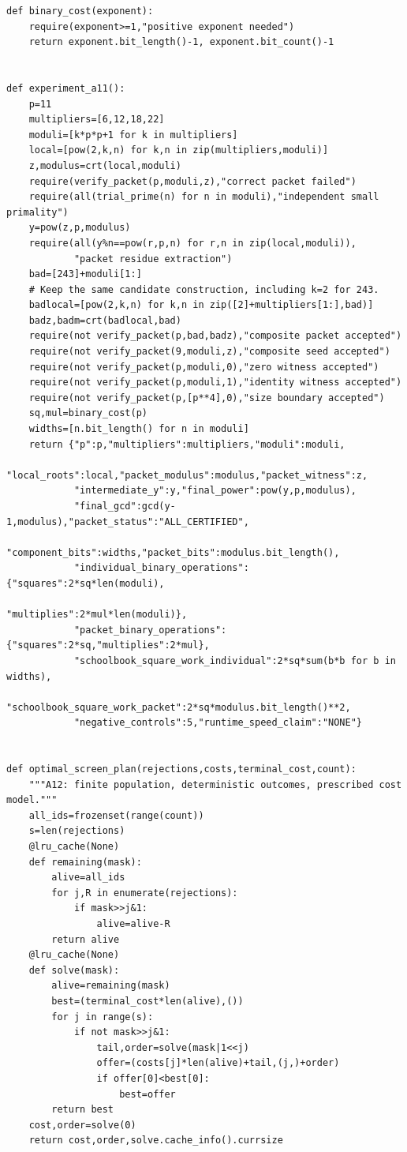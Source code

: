 \documentclass[11pt,a4paper]{article}
\theoremstyle{definition}\newtheorem{definition}[theorem]{Definition}
\theoremstyle{remark}\newtheorem{remark}[theorem]{Remark}
\begin{document}
\begin{lstlisting}[label=lst:arithmetic]
def binary_cost(exponent):
    require(exponent>=1,"positive exponent needed")
    return exponent.bit_length()-1, exponent.bit_count()-1


def experiment_a11():
    p=11
    multipliers=[6,12,18,22]
    moduli=[k*p*p+1 for k in multipliers]
    local=[pow(2,k,n) for k,n in zip(multipliers,moduli)]
    z,modulus=crt(local,moduli)
    require(verify_packet(p,moduli,z),"correct packet failed")
    require(all(trial_prime(n) for n in moduli),"independent small primality")
    y=pow(z,p,modulus)
    require(all(y%n==pow(r,p,n) for r,n in zip(local,moduli)),
            "packet residue extraction")
    bad=[243]+moduli[1:]
    # Keep the same candidate construction, including k=2 for 243.
    badlocal=[pow(2,k,n) for k,n in zip([2]+multipliers[1:],bad)]
    badz,badm=crt(badlocal,bad)
    require(not verify_packet(p,bad,badz),"composite packet accepted")
    require(not verify_packet(9,moduli,z),"composite seed accepted")
    require(not verify_packet(p,moduli,0),"zero witness accepted")
    require(not verify_packet(p,moduli,1),"identity witness accepted")
    require(not verify_packet(p,[p**4],0),"size boundary accepted")
    sq,mul=binary_cost(p)
    widths=[n.bit_length() for n in moduli]
    return {"p":p,"multipliers":multipliers,"moduli":moduli,
            "local_roots":local,"packet_modulus":modulus,"packet_witness":z,
            "intermediate_y":y,"final_power":pow(y,p,modulus),
            "final_gcd":gcd(y-1,modulus),"packet_status":"ALL_CERTIFIED",
            "component_bits":widths,"packet_bits":modulus.bit_length(),
            "individual_binary_operations":{"squares":2*sq*len(moduli),
                                            "multiplies":2*mul*len(moduli)},
            "packet_binary_operations":{"squares":2*sq,"multiplies":2*mul},
            "schoolbook_square_work_individual":2*sq*sum(b*b for b in widths),
            "schoolbook_square_work_packet":2*sq*modulus.bit_length()**2,
            "negative_controls":5,"runtime_speed_claim":"NONE"}


def optimal_screen_plan(rejections,costs,terminal_cost,count):
    """A12: finite population, deterministic outcomes, prescribed cost model."""
    all_ids=frozenset(range(count))
    s=len(rejections)
    @lru_cache(None)
    def remaining(mask):
        alive=all_ids
        for j,R in enumerate(rejections):
            if mask>>j&1:
                alive=alive-R
        return alive
    @lru_cache(None)
    def solve(mask):
        alive=remaining(mask)
        best=(terminal_cost*len(alive),())
        for j in range(s):
            if not mask>>j&1:
                tail,order=solve(mask|1<<j)
                offer=(costs[j]*len(alive)+tail,(j,)+order)
                if offer[0]<best[0]:
                    best=offer
        return best
    cost,order=solve(0)
    return cost,order,solve.cache_info().currsize



\end{lstlisting}
\end{document}
